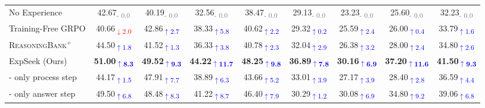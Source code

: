 \begin{table}[!ht]
\begin{tabular*}{0.97\textwidth}{@{\extracolsep{\fill}}l cccc ccc c@{}}
    No Experience & 42.67\textsubscript{\textcolor{gray}{- 0.0}} & 40.19\textsubscript{\textcolor{gray}{- 0.0}} & 32.56\textsubscript{\textcolor{gray}{- 0.0}} & 38.47\textsubscript{\textcolor{gray}{- 0.0}} & 29.13\textsubscript{\textcolor{gray}{- 0.0}} & 23.23\textsubscript{\textcolor{gray}{- 0.0}} & 25.60\textsubscript{\textcolor{gray}{- 0.0}} & 32.23\textsubscript{\textcolor{gray}{- 0.0}} \\
    Training-Free GRPO & 40.66\textsubscript{\textcolor{red}{$\downarrow$2.0}} & 42.86\textsubscript{\textcolor{blue}{$\uparrow$2.7}} & 38.33\textsubscript{\textcolor{blue}{$\uparrow$5.8}} & 40.62\textsubscript{\textcolor{blue}{$\uparrow$2.2}} & 29.32\textsubscript{\textcolor{blue}{$\uparrow$0.2}} & 25.59\textsubscript{\textcolor{blue}{$\uparrow$2.4}} & 26.00\textsubscript{\textcolor{blue}{$\uparrow$0.4}} & 33.79\textsubscript{\textcolor{blue}{$\uparrow$1.6}} \\
    \textsc{ReasoningBank}$^+$ & 44.50\textsubscript{\textcolor{blue}{$\uparrow$1.8}} & 41.52\textsubscript{\textcolor{blue}{$\uparrow$1.3}} & 36.33\textsubscript{\textcolor{blue}{$\uparrow$3.8}} & 40.78\textsubscript{\textcolor{blue}{$\uparrow$2.3}} & 32.04\textsubscript{\textcolor{blue}{$\uparrow$2.9}} & 26.38\textsubscript{\textcolor{blue}{$\uparrow$3.2}} & 28.00\textsubscript{\textcolor{blue}{$\uparrow$2.4}} & 34.80\textsubscript{\textcolor{blue}{$\uparrow$2.6}} \\
    ExpSeek (Ours) & \textbf{51.00}\textsubscript{\textbf{\textcolor{blue}{$\uparrow$8.3}}} & \textbf{49.52}\textsubscript{\textbf{\textcolor{blue}{$\uparrow$9.3}}} & \textbf{44.22}\textsubscript{\textbf{\textcolor{blue}{$\uparrow$11.7}}} & \textbf{48.25}\textsubscript{\textbf{\textcolor{blue}{$\uparrow$9.8}}} & \textbf{36.89}\textsubscript{\textbf{\textcolor{blue}{$\uparrow$7.8}}} & \textbf{30.16}\textsubscript{\textbf{\textcolor{blue}{$\uparrow$6.9}}} & \textbf{37.20}\textsubscript{\textbf{\textcolor{blue}{$\uparrow$11.6}}} & \textbf{41.50}\textsubscript{\textbf{\textcolor{blue}{$\uparrow$9.3}}} \\
    - only process step & 44.17\textsubscript{\textcolor{blue}{$\uparrow$1.5}} & 47.91\textsubscript{\textcolor{blue}{$\uparrow$7.7}} & 38.89\textsubscript{\textcolor{blue}{$\uparrow$6.3}} & 43.66\textsubscript{\textcolor{blue}{$\uparrow$5.2}} & 33.01\textsubscript{\textcolor{blue}{$\uparrow$3.9}} & 27.17\textsubscript{\textcolor{blue}{$\uparrow$3.9}} & 28.40\textsubscript{\textcolor{blue}{$\uparrow$2.8}} & 36.59\textsubscript{\textcolor{blue}{$\uparrow$4.4}} \\
    - only answer step & 49.50\textsubscript{\textcolor{blue}{$\uparrow$6.8}} & 48.48\textsubscript{\textcolor{blue}{$\uparrow$8.3}} & 41.22\textsubscript{\textcolor{blue}{$\uparrow$8.7}} & 46.40\textsubscript{\textcolor{blue}{$\uparrow$7.9}} & 30.29\textsubscript{\textcolor{blue}{$\uparrow$1.2}} & 30.08\textsubscript{\textcolor{blue}{$\uparrow$6.9}} & 34.80\textsubscript{\textcolor{blue}{$\uparrow$9.2}} & 39.06\textsubscript{\textcolor{blue}{$\uparrow$6.8}} \\


\end{tabular*}
\end{table}
